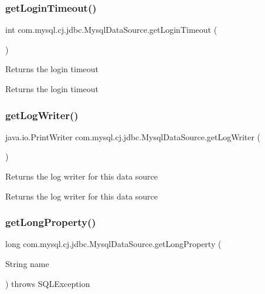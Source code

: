 \subsubsection{\texorpdfstring{get\+Login\+Timeout()}{getLoginTimeout()}}
{\footnotesize\ttfamily int com.\+mysql.\+cj.\+jdbc.\+Mysql\+Data\+Source.\+get\+Login\+Timeout (\begin{DoxyParamCaption}{ }\end{DoxyParamCaption})}

Returns the login timeout

\begin{DoxyReturn}{Returns}
the login timeout 
\end{DoxyReturn}
\mbox{\label{classcom_1_1mysql_1_1cj_1_1jdbc_1_1_mysql_data_source_a89b785e08483618bd420c334652905e6}} 
\subsubsection{\texorpdfstring{get\+Log\+Writer()}{getLogWriter()}}
{\footnotesize\ttfamily java.\+io.\+Print\+Writer com.\+mysql.\+cj.\+jdbc.\+Mysql\+Data\+Source.\+get\+Log\+Writer (\begin{DoxyParamCaption}{ }\end{DoxyParamCaption})}

Returns the log writer for this data source

\begin{DoxyReturn}{Returns}
the log writer for this data source 
\end{DoxyReturn}
\mbox{\label{classcom_1_1mysql_1_1cj_1_1jdbc_1_1_mysql_data_source_a4bfc0b60a4e40ad406e2a9f1b55ab1d4}} 
\subsubsection{\texorpdfstring{get\+Long\+Property()}{getLongProperty()}}
{\footnotesize\ttfamily long com.\+mysql.\+cj.\+jdbc.\+Mysql\+Data\+Source.\+get\+Long\+Property (\begin{DoxyParamCaption}\item[{String}]{name }\end{DoxyParamCaption}) throws S\+Q\+L\+Exception\hspace{0.3cm}{\ttfamily [protected]}}


